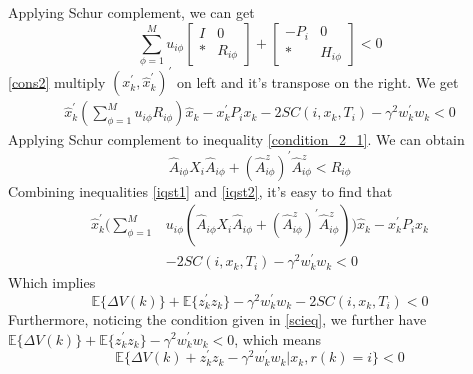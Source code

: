 \documentclass[conference]{IEEEtran}
\begin{document}
Applying Schur complement, we can get \\
\begin{equation} \label{cons2}
\sum_{\phi=1}^{M}u_{i\phi} \begin{bmatrix}
I&0\\
*&R_{i\phi}
\end{bmatrix} + \begin{bmatrix}
-P_{i }&0\\
*&H_{i\phi}
\end{bmatrix} <0
\end{equation}
\eqref{cons2} multiply $(x^{'}_k,\hat{x}^{'}_{k})^{'}$ on left and it's transpose on the right. We get\\
\begin{equation} \label{iqst1}
	\begin{split}
		\hat{x}^{'}_{k}(\sum_{\phi=1}^{M}u_{i\phi}R_{i\phi})\hat{x}_k-x^{'}_{k}P_{i}x_{k}-2SC(i,x_k,T_i)-\gamma^{2}w^{'}_{k}w_{k}<0
	\end{split}
\end{equation}
Applying Schur complement to inequality \eqref{condition_2_1}. We can obtain \\
\begin{equation} \label{iqst2}
\hat{A}_{i\phi}X_{i}\hat{A}_{i\phi}+(\hat{A}^{z}_{i\phi})^{'}\hat{A}^{z}_{i\phi}<R_{i\phi}
\end{equation}
Combining inequalities \eqref{iqst1} and \eqref{iqst2}, it's easy to find that \\
\begin{equation} \label{leq222}
	\begin{split}
		\hat{x}^{'}_{k}\Big(\sum_{\phi=1}^{M}&u_{i\phi}(\hat{A}_{i\phi}X_{i}\hat{A}_{i\phi}+(\hat{A}^{z}_{i\phi})^{'}\hat{A}^{z}_{i\phi})\Big)\hat{x}_k-x^{'}_{k}P_{i}x_{k}\\
		&-2SC(i,x_k,T_i)-\gamma^{2}w^{'}_{k}w_{k}<0
	\end{split}
\end{equation}
Which implies 
\begin{equation} \label{eq31}
	\mathbb{E}\{\varDelta V(k)\}+\mathbb{E}\{z^{'}_{k}z_{k}\}-\gamma^{2}w^{'}_{k}w_{k}-2SC(i,x_k,T_i)<0
\end{equation}
Furthermore, noticing the condition given in \eqref{scieq}, we further have $\mathbb{E}\{\varDelta V(k)\}+\mathbb{E}\{z^{'}_{k}z_{k}\}-\gamma^{2}w^{'}_{k}w_{k}<0$, which means
\begin{equation}
	\mathbb{E}\{\varDelta V(k)+z^{'}_{k}z_{k}-\gamma^{2}w^{'}_{k}w_{k}|x_{k},r(k)=i \}<0
\end{equation}
\end{document}
